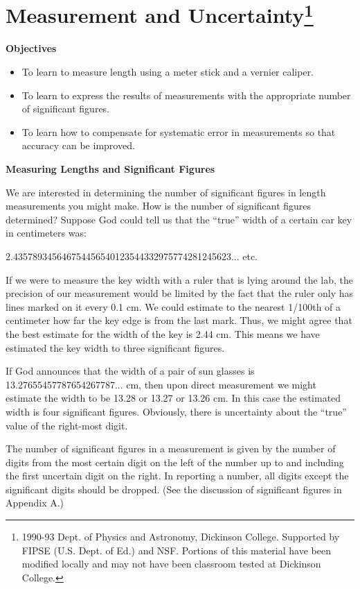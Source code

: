 
\section{Measurement and Uncertainty\footnote{
1990-93 Dept. of Physics and Astronomy, Dickinson College. Supported by FIPSE
(U.S. Dept. of Ed.) and NSF. Portions of this material have been modified locally
and may not have been classroom tested at Dickinson College.
}}

\makelabheader %

\textbf{Objectives} 

\begin{itemize}
\item To learn to measure length using a meter stick and a vernier caliper. 
\item To learn to express the results of measurements with the appropriate number
of significant figures. 
\item To learn how to compensate for systematic error in measurements so that accuracy
can be improved.
\end{itemize}
\textbf{Measuring Lengths and Significant Figures} 

We are interested in determining the number of significant figures in length
measurements you might make. How is the number of significant figures determined?
Suppose God could tell us that the ``true'' width of a certain
car key in centimeters was:

2.435789345646754456540123544332975774281245623... etc. 

If we were to measure the key width with a ruler that is lying around the lab,
the precision of our measurement would be limited by the fact that the ruler
only has lines marked on it every 0.1 cm. We could estimate to the nearest 1/100th
of a centimeter how far the key edge is from the last mark. Thus, we might agree
that the best estimate for the width of the key is 2.44 cm. This means we have
estimated the key width to three significant figures. 

If God announces that the width of a pair of sun glasses is 13.27655457787654267787...
cm, then upon direct measurement we might estimate the width to be 13.28 or
13.27 or 13.26 cm. In this case the estimated width is four significant figures.
Obviously, there is uncertainty about the ``true'' value of
the right-most digit.

The number of significant figures in a measurement is given by the number of
digits from the most certain digit on the left of the number up to and including
the first uncertain digit on the right. In reporting a number, all digits except
the significant digits should be dropped. (See the discussion of significant
figures in Appendix A.)

